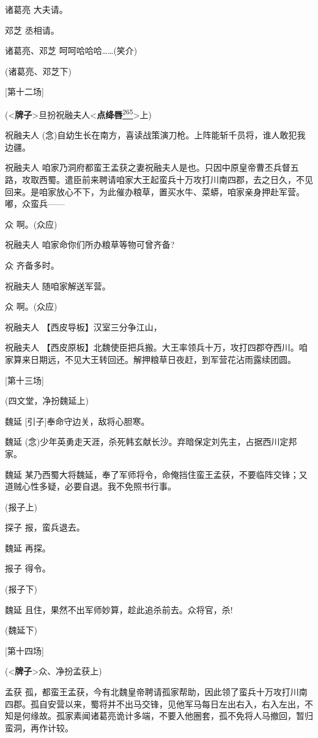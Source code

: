 诸葛亮 大夫请。

邓芝 丞相请。

诸葛亮、邓芝 呵呵哈哈哈\ldots{}\ldots{}(笑介)

(诸葛亮、邓芝下)

{[}第十二场{]}

(\textless{}\textbf{牌子}\textgreater{}旦扮祝融夫人\textless{}\textbf{点绛唇}\protect\hyperlink{fn265}{\textsuperscript{265}}\textgreater{}上)

祝融夫人
(念)自幼生长在南方，喜读战策演刀枪。上阵能斩千员将，谁人敢犯我边疆。

祝融夫人
咱家乃洞府都蛮王孟获之妻祝融夫人是也。只因中原皇帝曹丕兵督五路，攻取西蜀。遣臣前来聘请咱家大王起蛮兵十万攻打川南四郡，去之日久，不见回来。是咱家放心不下，为此催办粮草，置买水牛、菜蟒，咱家亲身押赴军营。嘟，众蛮兵------

众 啊。(众应)

祝融夫人 咱家命你们所办粮草等物可曾齐备?

众 齐备多时。

祝融夫人 随咱家解送军营。

众 啊。(众应)

祝融夫人 【西皮导板】汉室三分争江山，

祝融夫人
【西皮原板】北魏使臣把兵搬。大王率领兵十万，攻打四郡夺西川。咱家算来日期远，不见大王转回还。解押粮草日夜赶，到军营花沾雨露续团圆。

{[}第十三场{]}

(四文堂，净扮魏延上)

魏延 {[}引子{]}奉命守边关，敌将心胆寒。

魏延
(念)少年英勇走天涯，杀死韩玄献长沙。弃暗保定刘先主，占据西川定邦家。

魏延
某乃西蜀大将魏延，奉了军师将令，命俺挡住蛮王孟获，不要临阵交锋；又道贼心性多疑，必要自退。我不免照书行事。

(报子上)

探子 报，蛮兵退去。

魏延 再探。

报子 得令。

(报子下)

魏延 且住，果然不出军师妙算，趁此追杀前去。众将官，杀!

(魏延下)

{[}第十四场{]}

(\textless{}\textbf{牌子}\textgreater{}众、净扮孟获上)

孟获
孤，都蛮王孟获，今有北魏皇帝聘请孤家帮助，因此领了蛮兵十万攻打川南四郡。孤自安营以来，蜀将并不出马交锋，见他军马每日左出右入，右入左出，不知是何缘故。孤家素闻诸葛亮诡计多端，不要入他圈套，孤不免将人马撤回，暂归蛮洞，再作计较。

